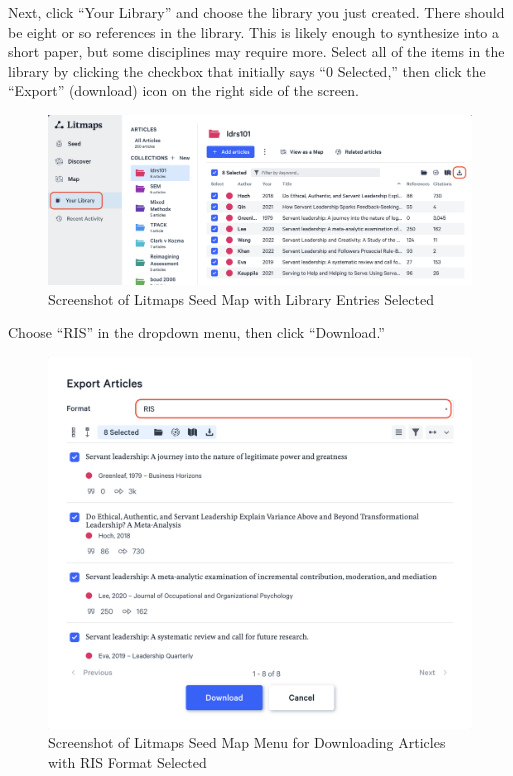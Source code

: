 \documentclass[
  letterpaper,
  DIV=11,
  numbers=noendperiod]{scrreprt}
\begin{document}
Next, click ``Your Library'' and choose the library you just created.
There should be eight or so references in the library. This is likely
enough to synthesize into a short paper, but some disciplines may
require more. Select all of the items in the library by clicking the
checkbox that initially says ``0 Selected,'' then click the ``Export''
(download) icon on the right side of the screen.

\begin{figure}

\caption{\label{fig-litmaps13}Screenshot of Litmaps Seed Map with
Library Entries Selected}

\includegraphics{assets/u2/litmaps13.png}

\end{figure}%

Choose ``RIS'' in the dropdown menu, then click ``Download.''

\begin{figure}

\caption{\label{fig-litmaps14}Screenshot of Litmaps Seed Map Menu for
Downloading Articles with RIS Format Selected}

\includegraphics{assets/u2/litmaps14.png}

\end{figure}%
\end{document}
